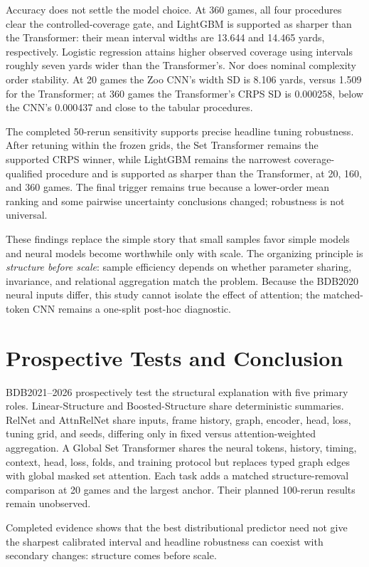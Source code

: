 \documentclass[10pt,letterpaper]{article}
\begin{document}
Accuracy does not settle the model choice. At 360 games, all four procedures clear the controlled-coverage gate, and LightGBM is supported as sharper than the Transformer: their mean interval widths are 13.644 and 14.465 yards, respectively. Logistic regression attains higher observed coverage using intervals roughly seven yards wider than the Transformer's. Nor does nominal complexity order stability. At 20 games the Zoo CNN's width SD is 8.106 yards, versus 1.509 for the Transformer; at 360 games the Transformer's CRPS SD is 0.000258, below the CNN's 0.000437 and close to the tabular procedures.

The completed 50-rerun sensitivity supports precise headline tuning robustness. After retuning within the frozen grids, the Set Transformer remains the supported CRPS winner, while LightGBM remains the narrowest coverage-qualified procedure and is supported as sharper than the Transformer, at 20, 160, and 360 games. The final trigger remains true because a lower-order mean ranking and some pairwise uncertainty conclusions changed; robustness is not universal.

These findings replace the simple story that small samples favor simple models and neural models become worthwhile only with scale. The organizing principle is \emph{structure before scale}: sample efficiency depends on whether parameter sharing, invariance, and relational aggregation match the problem. Because the BDB2020 neural inputs differ, this study cannot isolate the effect of attention; the matched-token CNN remains a one-split post-hoc diagnostic.

\section*{Prospective Tests and Conclusion}

BDB2021--2026 prospectively test the structural explanation with five primary roles. Linear-Structure and Boosted-Structure share deterministic summaries. RelNet and AttnRelNet share inputs, frame history, graph, encoder, head, loss, tuning grid, and seeds, differing only in fixed versus attention-weighted aggregation. A Global Set Transformer shares the neural tokens, history, timing, context, head, loss, folds, and training protocol but replaces typed graph edges with global masked set attention. Each task adds a matched structure-removal comparison at 20 games and the largest anchor. Their planned 100-rerun results remain unobserved.

Completed evidence shows that the best distributional predictor need not give the sharpest calibrated interval and headline robustness can coexist with secondary changes: structure comes before scale.
\end{document}
